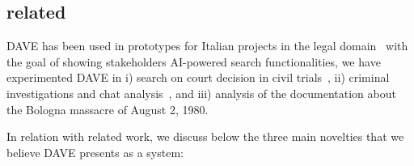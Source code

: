 \subsection{related}
DAVE has been used in prototypes for Italian projects in the legal domain~\cite{BatiniSPBFZPVR24} with the goal of showing stakeholders AI-powered search functionalities, we have experimented DAVE in i) search on court decision in civil trials~\cite{BELLANDI2024105904}, ii) criminal investigations and chat analysis~\cite{pozzi_wise_2025}, and iii) analysis of the documentation about the Bologna massacre of August 2, 1980.



In relation with related work, we discuss below the three main novelties that we believe DAVE presents as a system: 



